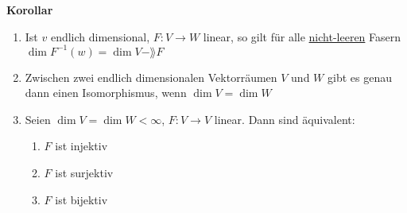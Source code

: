 \textbf{Korollar} 
\begin{enumerate}[{(}a{)}]
    \item Ist $v$ endlich dimensional, $F: V \rightarrow W$ linear, so gilt für alle \underline{nicht-leeren} Fasern $\dim F^{-1}(w) = \dim V - \rang F$
    
    \item Zwischen zwei endlich dimensionalen Vektorräumen $V$ und $W$ gibt es genau dann einen Isomorphismus, wenn $\dim V = \dim W$
    
    \item Seien $\dim V = \dim W < \infty$, $F: V \rightarrow V$ linear. Dann sind äquivalent:
    \begin{enumerate}[{(}i{)}]
        \item $F$ ist injektiv
        
        \item $F$ ist surjektiv
        
        \item $F$ ist bijektiv
    \end{enumerate}
\end{enumerate}

